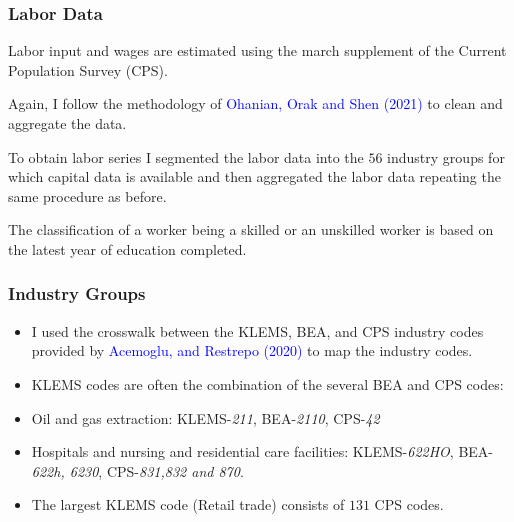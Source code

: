 \documentclass[notes,11pt, aspectratio=169]{beamer}
\newenvironment{wideitemize}{\itemize\addtolength{\itemsep}{10pt}}{\enditemize}
\begin{document}
\begin{frame}
\frametitle{Labor Data}
\begin{wideitemize}
 \item Labor input and wages are estimated using the march supplement of the Current Population Survey (CPS).
 \item Again, I follow the methodology of \textcolor{blue}{Ohanian, Orak and Shen (2021)} to clean and aggregate the data.
 \item To obtain labor series I segmented the labor data into the $56$ industry groups for which capital data is available and then aggregated the labor data repeating the same procedure as before.
 \item The classification of a worker being a skilled or an unskilled worker is based on the latest year of education completed.
\end{wideitemize}
\end{frame}

\begin{frame}
 \frametitle{Industry Groups}
 
 \begin{itemize}
 \item I used the crosswalk between the KLEMS, BEA, and CPS industry codes provided by \textcolor{blue}{Acemoglu, and Restrepo (2020)} to map the industry codes.
 \item KLEMS codes are often the combination of the several BEA and CPS codes:
 \vspace*{0.5cm}
 \begin{wideitemize}
 \item Oil and gas extraction: KLEMS-\textit{211}, BEA-\textit{2110}, CPS-\textit{42}
 \item Hospitals and nursing and residential care facilities: KLEMS-\textit{622HO}, BEA-\textit{622h, 6230}, CPS-\textit{831,832 and 870}.
 \item The largest KLEMS code (Retail trade) consists of $131$ CPS codes.
 \end{wideitemize}

 
 \end{itemize}

 
\end{frame}


\end{document}
